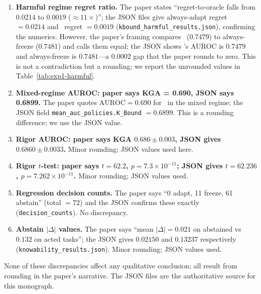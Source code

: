 \begin{enumerate}
  \item \textbf{Harmful regime regret ratio.}  The paper states ``regret-to-oracle falls
    from $0.0214$ to $0.0019$ ($\approx 11\times$)''; the JSON files give
    always-adapt regret $= 0.0214$ and \KGA\ regret $= 0.0019$
    (\texttt{kbound\_harmful\_results.json}), confirming the numerics.
    However, the paper's framing compares \KGA\ ($0.7479$) to always-freeze ($0.7481$)
    and calls them equal; the JSON shows \KGA's AUROC is $0.7479$ and
    always-freeze is $0.7481$---a $0.0002$ gap that the paper rounds to zero.  This
    is not a contradiction but a rounding; we report the unrounded values in
    Table~\ref{tab:exp1-harmful}.

  \item \textbf{Mixed-regime AUROC: paper says KGA = 0.690, JSON says 0.6899.}
    The paper quotes $\text{AUROC} = 0.690$ for \KGA\ in the mixed regime; the JSON
    field \texttt{mean\_auc\_policies.K\_Bound} $= 0.6899$.  This is a rounding
    difference; we use the JSON value.

  \item \textbf{Rigor AUROC: paper says KGA $0.686 \pm 0.003$, JSON gives $0.6860 \pm 0.0033$.}
    Minor rounding; JSON values used here.

  \item \textbf{Rigor $t$-test: paper says $t = 62.2$, $p = 7.3 \times 10^{-11}$;
    JSON gives $t = 62.236$, $p = 7.262 \times 10^{-11}$.}  Minor rounding; JSON
    values used.

  \item \textbf{Regression decision counts.}  The paper says ``0 adapt, 11 freeze,
    61 abstain'' (total $= 72$) and the JSON confirms these exactly
    (\texttt{decision\_counts}).  No discrepancy.

  \item \textbf{Abstain $|\Delta|$ values.}  The paper says ``mean $|\Delta| = 0.021$
    on abstained vs $0.132$ on acted tasks''; the JSON gives $0.02150$ and $0.13237$
    respectively (\texttt{knowability\_results.json}).  Minor rounding; JSON values
    used.
\end{enumerate}

None of these discrepancies affect any qualitative conclusion; all result from rounding in
the paper's narrative.  The JSON files are the authoritative source for this monograph.
